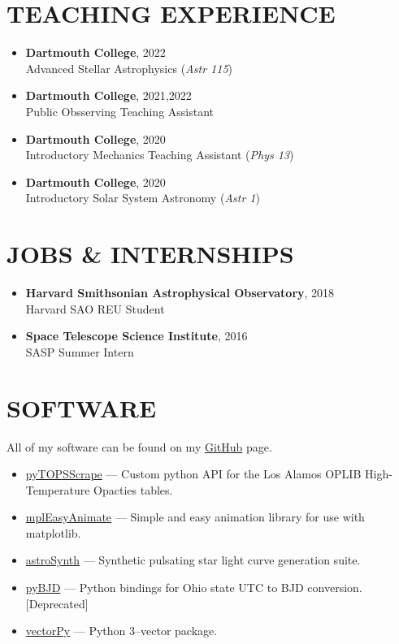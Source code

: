 \documentclass[margin, 10pt]{res} %
\begin{document}
\begin{resume}
\section{TEACHING EXPERIENCE}
\begin{itemize}
	\item {\scriptsize \textbf{Dartmouth College}}, {\small 2022} \\ Advanced Stellar Astrophysics (\textit{Astr 115})
	\item {\scriptsize \textbf{Dartmouth College}}, {\small 2021,2022} \\ Public Obsserving Teaching Assistant
	\item {\scriptsize \textbf{Dartmouth College}}, {\small 2020} \\ Introductory Mechanics Teaching Assistant (\textit{Phys 13})
	\item {\scriptsize \textbf{Dartmouth College}}, {\small 2020} \\ Introductory Solar System Astronomy (\textit{Astr 1})
\end{itemize}

\section{JOBS \& INTERNSHIPS}
\begin{itemize}
  \item \textbf{{\scriptsize Harvard Smithsonian Astrophysical Observatory}}, {\small 2018} \\Harvard SAO REU Student
  \item \textbf{{\scriptsize Space Telescope Science Institute}}, {\small 2016} \\SASP Summer Intern
\end{itemize}

\section{SOFTWARE}
All of my software can be found on my \href{https://github.com/tboudreaux}{GitHub} page.
\begin{itemize}
	\item \href{https://github.com/tboudreaux/pytopsscrape}{pyTOPSScrape} --- Custom python API for the Los Alamos OPLIB High-Temperature Opacties tables.
	\item \href{https://github.com/tboudreaux/mpl_animate}{mplEasyAnimate} --- Simple and easy animation library for use with matplotlib.
	\item \href{https://github.com/AstroSynth/astroSynth}{astroSynth} --- Synthetic pulsating star light curve generation suite.
	\item \href{https://github.com/tboudreaux/pyBJD}{pyBJD} --- Python bindings for Ohio state UTC to BJD conversion. [Deprecated]
	\item \href{https://github.com/tboudreaux/vectorpy}{vectorPy} --- Python 3--vector package.
\end{itemize}


\end{resume}
\end{document}
